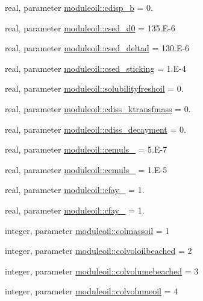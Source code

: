 \begin{DoxyCompactItemize}
\item 
real, parameter \mbox{\hyperlink{namespacemoduleoil_aa8fdd7072f57d8703ac2a0aa5b73438b}{moduleoil\+::cdisp\+\_\+b}} = 0.
\item 
real, parameter \mbox{\hyperlink{namespacemoduleoil_aa8fc0a736aaeb89fe85f27d92b6700f5}{moduleoil\+::csed\+\_\+d0}} = 135.\+E-\/6
\item 
real, parameter \mbox{\hyperlink{namespacemoduleoil_a42957e6ffc6b29b2df9f369b5de99ac0}{moduleoil\+::csed\+\_\+deltad}} = 130.\+E-\/6
\item 
real, parameter \mbox{\hyperlink{namespacemoduleoil_a0be30fe03f8b242de5ca3172e8c7014c}{moduleoil\+::csed\+\_\+sticking}} = 1.\+E-\/4
\item 
real, parameter \mbox{\hyperlink{namespacemoduleoil_a87308e17b6b42f0df4a04bbfbe791a84}{moduleoil\+::solubilityfreshoil}} = 0.
\item 
real, parameter \mbox{\hyperlink{namespacemoduleoil_a43202f3556eded5c151df73d098477c6}{moduleoil\+::cdiss\+\_\+ktransfmass}} = 0.
\item 
real, parameter \mbox{\hyperlink{namespacemoduleoil_aa9c81e28b328f76962efa72af32162f9}{moduleoil\+::cdiss\+\_\+decayment}} = 0.
\item 
real, parameter \mbox{\hyperlink{namespacemoduleoil_ac1fb44ad8e24ebba2cdf05bac6d1351e}{moduleoil\+::cemuls\+\_}} = 5.\+E-\/7
\item 
real, parameter \mbox{\hyperlink{namespacemoduleoil_a36f8acd949415f908de4279b101905ce}{moduleoil\+::cemuls\+\_}} = 1.\+E-\/5
\item 
real, parameter \mbox{\hyperlink{namespacemoduleoil_a8e5cd4a6280206c46ff2a18cd101b8ff}{moduleoil\+::cfay\+\_}} = 1.
\item 
real, parameter \mbox{\hyperlink{namespacemoduleoil_a9023ee9f1ee5e3bbd3ef73b0fc3ad25b}{moduleoil\+::cfay\+\_}} = 1.
\item 
integer, parameter \mbox{\hyperlink{namespacemoduleoil_ae298702c324458a69504cb168fbc09c8}{moduleoil\+::colmassoil}} = 1
\item 
integer, parameter \mbox{\hyperlink{namespacemoduleoil_aa67a0e7842c42e4504c82fd7f85324c0}{moduleoil\+::colvoloilbeached}} = 2
\item 
integer, parameter \mbox{\hyperlink{namespacemoduleoil_af255dead494f9fb2acaf47a4d0dec9d4}{moduleoil\+::colvolumebeached}} = 3
\item 
integer, parameter \mbox{\hyperlink{namespacemoduleoil_a585198a23d58889aa724511f30843dff}{moduleoil\+::colvolumeoil}} = 4

\end{DoxyCompactItemize}
